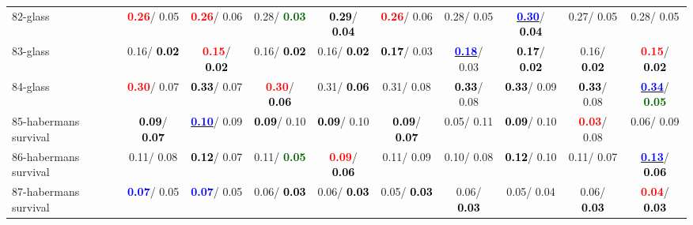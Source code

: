 \begin{table}[h]
\begin{center}
{\begin{tabular}{lc|c|c|c|c|c|c|c|c}
82-glass & \textcolor{red}{\textbf{  0.26}}/  0.05 & \textcolor{red}{\textbf{  0.26}}/  0.06 &   0.28/\textcolor{darkgreen}{\textbf{  0.03}} & \textcolor{black}{\textbf{  0.29}}/\textcolor{black}{\textbf{  0.04}} & \textcolor{red}{\textbf{  0.26}}/  0.06 &   0.28/  0.05 & \underline{\textcolor{blue}{\textbf{  0.30}}}/\textcolor{black}{\textbf{  0.04}} &   0.27/  0.05 &   0.28/  0.05 \\
83-glass &   0.16/\textcolor{black}{\textbf{  0.02}} & \textcolor{red}{\textbf{  0.15}}/\textcolor{black}{\textbf{  0.02}} &   0.16/\textcolor{black}{\textbf{  0.02}} &   0.16/\textcolor{black}{\textbf{  0.02}} & \textcolor{black}{\textbf{  0.17}}/  0.03 & \underline{\textcolor{blue}{\textbf{  0.18}}}/  0.03 & \textcolor{black}{\textbf{  0.17}}/\textcolor{black}{\textbf{  0.02}} &   0.16/\textcolor{black}{\textbf{  0.02}} & \textcolor{red}{\textbf{  0.15}}/\textcolor{black}{\textbf{  0.02}} \\
84-glass & \textcolor{red}{\textbf{  0.30}}/  0.07 & \textcolor{black}{\textbf{  0.33}}/  0.07 & \textcolor{red}{\textbf{  0.30}}/\textcolor{black}{\textbf{  0.06}} &   0.31/\textcolor{black}{\textbf{  0.06}} &   0.31/  0.08 & \textcolor{black}{\textbf{  0.33}}/  0.08 & \textcolor{black}{\textbf{  0.33}}/  0.09 & \textcolor{black}{\textbf{  0.33}}/  0.08 & \underline{\textcolor{blue}{\textbf{  0.34}}}/\textcolor{darkgreen}{\textbf{  0.05}} \\
85-habermans survival & \textcolor{black}{\textbf{  0.09}}/\textcolor{black}{\textbf{  0.07}} & \underline{\textcolor{blue}{\textbf{  0.10}}}/  0.09 & \textcolor{black}{\textbf{  0.09}}/  0.10 & \textcolor{black}{\textbf{  0.09}}/  0.10 & \textcolor{black}{\textbf{  0.09}}/\textcolor{black}{\textbf{  0.07}} &   0.05/  0.11 & \textcolor{black}{\textbf{  0.09}}/  0.10 & \textcolor{red}{\textbf{  0.03}}/  0.08 &   0.06/  0.09 \\ \hline
86-habermans survival &   0.11/  0.08 & \textcolor{black}{\textbf{  0.12}}/  0.07 &   0.11/\textcolor{darkgreen}{\textbf{  0.05}} & \textcolor{red}{\textbf{  0.09}}/\textcolor{black}{\textbf{  0.06}} &   0.11/  0.09 &   0.10/  0.08 & \textcolor{black}{\textbf{  0.12}}/  0.10 &   0.11/  0.07 & \underline{\textcolor{blue}{\textbf{  0.13}}}/\textcolor{black}{\textbf{  0.06}} \\
87-habermans survival & \textcolor{blue}{\textbf{  0.07}}/  0.05 & \textcolor{blue}{\textbf{  0.07}}/  0.05 &   0.06/\textcolor{black}{\textbf{  0.03}} &   0.06/\textcolor{black}{\textbf{  0.03}} &   0.05/\textcolor{black}{\textbf{  0.03}} &   0.06/\textcolor{black}{\textbf{  0.03}} &   0.05/  0.04 &   0.06/\textcolor{black}{\textbf{  0.03}} & \textcolor{red}{\textbf{  0.04}}/\textcolor{black}{\textbf{  0.03}} \\

\end{tabular}}
\end{center}
\end{table}
